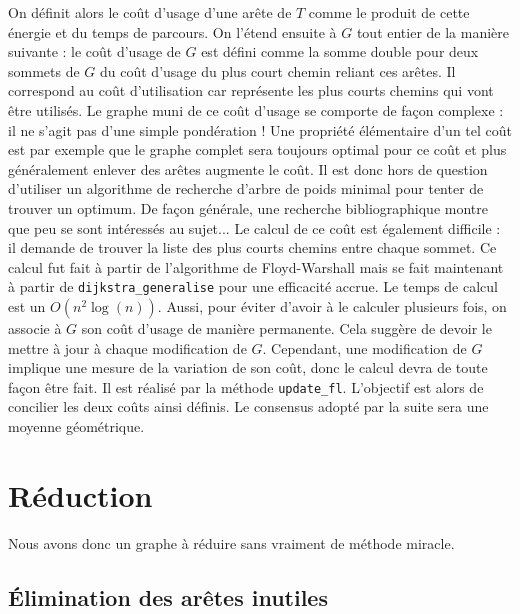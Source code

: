 \documentclass[french]{article}
\begin{document}
		On définit alors le coût d'usage d'une arête de $T$ comme le produit de cette énergie et du temps de parcours. On l'étend ensuite à $G$ tout entier de la manière suivante : le coût d'usage de $G$ est défini comme la somme double pour deux sommets de $G$ du coût d'usage du plus court chemin reliant ces arêtes. Il correspond au coût d'utilisation car représente les plus courts chemins qui vont être utilisés.\newline
		Le graphe muni de ce coût d'usage se comporte de façon complexe : il ne s'agit pas d'une simple pondération ! Une propriété élémentaire d'un tel coût est par exemple que le graphe complet sera toujours optimal pour ce coût et plus généralement enlever des arêtes augmente le coût. Il est donc hors de question d'utiliser un algorithme de recherche d'arbre de poids minimal pour tenter de trouver un optimum. De façon générale, une recherche bibliographique montre que peu se sont intéressés au sujet... \newline
		Le calcul de ce coût est également difficile : il demande de trouver la liste des plus courts chemins entre chaque sommet. Ce calcul fut fait à partir de l'algorithme de Floyd-Warshall mais se fait maintenant à partir de \verb?dijkstra_generalise? pour une efficacité accrue. Le temps de calcul est un $O(n^{2}\log(n))$. Aussi, pour éviter d'avoir à le calculer plusieurs fois, on associe à $G$ son coût d'usage de manière permanente. Cela suggère de devoir le mettre à jour à chaque modification de $G$. Cependant, une modification de $G$ implique une mesure de la variation de son coût, donc le calcul devra de toute façon être fait. Il est réalisé par la méthode \verb?update_fl?.
		\newline
		L'objectif est alors de concilier les deux coûts ainsi définis. Le consensus adopté par la suite sera une moyenne géométrique.
		\section{Réduction}

		Nous avons donc un graphe à réduire sans vraiment de méthode miracle.

			\subsection{Élimination des arêtes inutiles}
\end{document}
